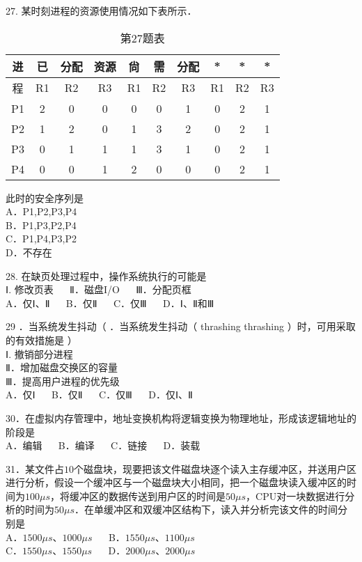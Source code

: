 27. 某时刻进程的资源使用情况如下表所示． \\
\begin{table}[ht]
\centering
\caption{第27题表}\label{Na11_tab2}
\begin{tabular}{|c|c|c|c|c|c|c|c|c|c|}
\hline
进 & 已 & 分配 & 资源 & 尙 & 需 & 分配 & * & * & * \\
\hline
程 & R1 & R2 & R3 & R1 & R2 & R3 & R1 & R2 & R3 \\
\hline
P1 & 2 & 0 & 0 & 0 & 0 & 1 & 0 & 2 & 1 \\
\hline
P2 & 1 & 2 & 0 & 1 & 3 & 2 & 0 & 2 & 1 \\
\hline
P3 & 0 & 1 & 1 & 1 & 3 & 1 & 0 & 2 & 1 \\
\hline
P4 & 0 & 0 & 1 & 2 & 0 & 0 & 0 & 2 & 1 \\
\hline
\end{tabular}
\end{table}

此时的安全序列是 \\
A．P1,P2,P3,P4 \\
B．P1,P3,P2,P4 \\
C．P1,P4,P3,P2 \\
D．不存在


28. 在缺页处理过程中，操作系统执行的可能是 \\
Ⅰ. 修改页表 $\quad$ Ⅱ．磁盘I/O $\quad$ Ⅲ．分配页框 \\
A．仅Ⅰ、Ⅱ $\quad$ B．仅Ⅱ $\quad$ C．仅Ⅲ $\quad$ D．Ⅰ、Ⅱ和Ⅲ

29 ．当系统发生抖动（ ．当系统发生抖动（ thrashing thrashing ）时，可用采取的有效措施是 ） \\
Ⅰ. 撤销部分进程 \\
Ⅱ．增加磁盘交换区的容量 \\
Ⅲ．提高用户进程的优先级 \\
A．仅Ⅰ $\quad$ B．仅Ⅱ $\quad$ C．仅Ⅲ $\quad$ D．仅Ⅰ、Ⅱ

30．在虚拟内存管理中，地址变换机构将逻辑变换为物理地址，形成该逻辑地址的阶段是 \\
A．编辑 $\quad$ B．编译 $\quad$ C．链接 $\quad$ D．装载

31．某文件占$10$个磁盘块，现要把该文件磁盘块逐个读入主存缓冲区，并送用户区进行分析，假设一个缓冲区与一个磁盘块大小相同，把一个磁盘块读入缓冲区的时间为$100\mu s$，将缓冲区的数据传送到用户区的时间是$50\mu s$，CPU对一块数据进行分析的时间为$50\mu s$．在单缓冲区和双缓冲区结构下，读入并分析完该文件的时间分别是 \\
A．$1500\mu s$、$1000\mu s$ $\quad$ B．$1550\mu s$、$1100\mu s$ \\
C．$1550\mu s$、$1550\mu s$ $\quad$ D．$2000\mu s$、$2000\mu s$

